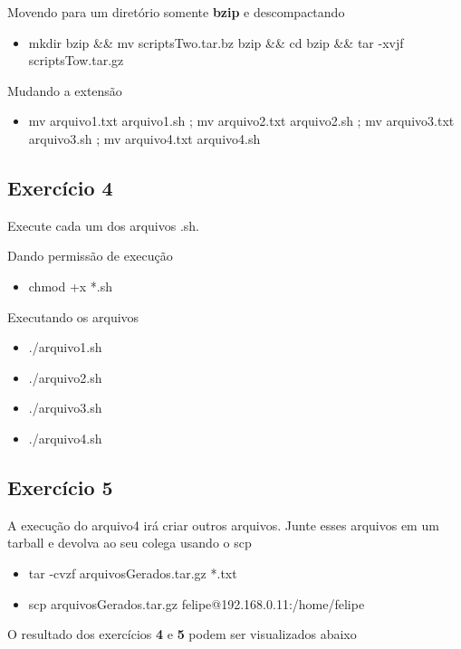 \documentclass[
	12pt,				%
	openany,			%
	a4paper,			%
	chapter=TITLE,		%
	section=TITLE,		%
	english,
	brazil				%
]{abntex2}
\begin{document}
Movendo para um diretório somente \textbf{bzip} e descompactando
\begin{itemize}
	\item mkdir bzip \&\& mv scriptsTwo.tar.bz bzip \&\& cd bzip \&\& tar -xvjf scriptsTow.tar.gz
\end{itemize}

Mudando a extensão
\begin{itemize}
	\item mv arquivo1.txt arquivo1.sh ; mv arquivo2.txt arquivo2.sh ; mv arquivo3.txt arquivo3.sh ; mv arquivo4.txt arquivo4.sh
\end{itemize}

\subsection{Exercício 4}

Execute cada um dos arquivos .sh.


Dando permissão de execução
\begin{itemize}
	\item chmod +x *.sh
\end{itemize}

Executando os arquivos
\begin{itemize}
	\item./arquivo1.sh
	\item ./arquivo2.sh
	\item ./arquivo3.sh
	\item ./arquivo4.sh
\end{itemize}

\subsection{Exercício 5}

A execução do arquivo4 irá criar outros arquivos. Junte esses arquivos em um tarball e devolva ao seu colega usando o scp

\begin{itemize}
	\item tar -cvzf arquivosGerados.tar.gz *.txt
	\item scp arquivosGerados.tar.gz felipe@192.168.0.11:/home/felipe 
\end{itemize}

O resultado dos exercícios \textbf{4} e \textbf{5} podem ser visualizados abaixo
\end{document}
